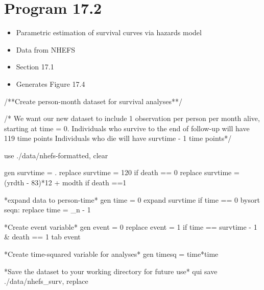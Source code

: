 \documentclass[
  10pt,
  a4paper,
]{book}
\newenvironment{Shaded}{\begin{snugshade}}{\end{snugshade}}
\newcommand{\CommentTok}[1]{\textcolor[rgb]{0.37,0.37,0.37}{#1}}
\newcommand{\DataTypeTok}[1]{\textcolor[rgb]{0.68,0.00,0.00}{#1}}
\newcommand{\KeywordTok}[1]{\textcolor[rgb]{0.00,0.46,0.62}{#1}}
\newcommand{\NormalTok}[1]{\textcolor[rgb]{0.00,0.46,0.62}{#1}}
\providecommand{\tightlist}{%
  \setlength{\itemsep}{0pt}\setlength{\parskip}{0pt}}
\begin{document}
\hypertarget{program-17.2-1}{%
\section{Program 17.2}\label{program-17.2-1}}

\begin{itemize}
\tightlist
\item
  Parametric estimation of survival curves via hazards model
\item
  Data from NHEFS
\item
  Section 17.1
\item
  Generates Figure 17.4
\end{itemize}

\begin{Shaded}
\begin{Highlighting}[]
\CommentTok{/**Create person{-}month dataset for survival analyses**/}

\CommentTok{/* We want our new dataset to include 1 observation per person }
\CommentTok{per month alive, starting at time = 0.}
\CommentTok{Individuals who survive to the end of follow{-}up will have }
\CommentTok{119 time points}
\CommentTok{Individuals who die will have survtime {-} 1 time points*/}

\KeywordTok{use}\NormalTok{ ./}\KeywordTok{data}\NormalTok{/nhefs{-}formatted, }\KeywordTok{clear}

\KeywordTok{gen}\NormalTok{ survtime = .}
\KeywordTok{replace}\NormalTok{ survtime = 120 }\KeywordTok{if}\NormalTok{ death == 0}
\KeywordTok{replace}\NormalTok{ survtime = (yrdth {-} 83)*12 + modth }\KeywordTok{if}\NormalTok{ death ==1}

\NormalTok{*expand }\KeywordTok{data}\NormalTok{ to person{-}time*}
\KeywordTok{gen}\NormalTok{ time = 0}
\NormalTok{expand survtime }\KeywordTok{if}\NormalTok{ time == 0}
\KeywordTok{bysort}\NormalTok{ seqn: }\KeywordTok{replace}\NormalTok{ time = }\DataTypeTok{\_n}\NormalTok{ {-} 1}

\NormalTok{*Create event }\KeywordTok{variable}\NormalTok{*}
\KeywordTok{gen}\NormalTok{ event = 0}
\KeywordTok{replace}\NormalTok{ event = 1 }\KeywordTok{if}\NormalTok{ time == survtime {-} 1 \& death == 1}
\KeywordTok{tab}\NormalTok{ event}

\NormalTok{*Create time{-}squared }\KeywordTok{variable} \KeywordTok{for}\NormalTok{ analyses*}
\KeywordTok{gen}\NormalTok{ timesq = time*time}

\NormalTok{*Save the dataset to your working directory }\KeywordTok{for}\NormalTok{ future }\KeywordTok{use}\NormalTok{*}
\KeywordTok{qui} \KeywordTok{save}\NormalTok{ ./}\KeywordTok{data}\NormalTok{/nhefs\_surv, }\KeywordTok{replace}


\end{Highlighting}
\end{Shaded}
\end{document}
